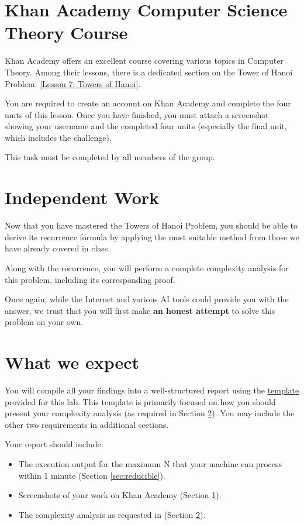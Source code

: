 \documentclass[11pt]{article}
\begin{document}
\section{Khan Academy Computer Science Theory Course}\label{sec:khan}
Khan Academy offers an excellent course covering various topics in Computer Theory. Among their lessons, there is a dedicated section on the Tower of Hanoi Problem: [\href{https://www.khanacademy.org/computing/computer-science/algorithms/towers-of-hanoi/a/towers-of-hanoi}{Lesson 7: Towers of Hanoi}].

You are required to create an account on Khan Academy and complete the four units of this lesson. Once you have finished, you must attach a screenshot showing your username and the completed four units (especially the final unit, which includes the challenge).

This task must be completed by all members of the group.

\section{Independent Work}\label{sec:work}
Now that you have mastered the Towers of Hanoi Problem, you should be able to derive its recurrence formula by applying the most suitable method from those we have already covered in class.

Along with the recurrence, you will perform a complete complexity analysis for this problem, including its corresponding proof.

Once again, while the Internet and various AI tools could provide you with the answer, we trust that you will first make \textbf{an honest attempt} to solve this problem on your own.

\section{What we expect}
You will compile all your findings into a well-structured report using the \href{https://drive.google.com/file/d/1jyfiDPpzuluE6UpEA-arws1D2_wtPVyC/view?usp=sharing}{template} provided for this lab. This template is primarily focused on how you should present your complexity analysis (as required in Section \ref{sec:work}). You may include the other two requirements in additional sections.

Your report should include:

\begin{itemize}
    \item The execution output for the maximum N that your machine can process within 1 minute (Section \ref{sec:reducible}).
    \item Screenshots of your work on Khan Academy (Section \ref{sec:khan}).
    \item The complexity analysis as requested in (Section \ref{sec:work}).
\end{itemize}
\end{document}
